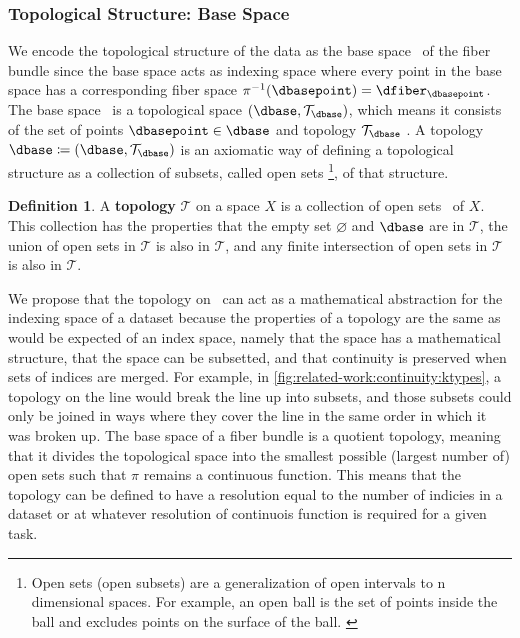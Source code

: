 \documentclass[10pt,journal,compsoc]{IEEEtran}
\theoremstyle{definition}
\newtheorem{definition}{Definition}[section]
\theoremstyle{remark}
\begin{document}
\subsubsection{Topological Structure: Base Space \dbase}
\label{sec:atct:fb:base}
We encode the topological structure of the data as the \textcolor{base}{base space} \dbase\ of the fiber bundle since the base space acts as indexing space where every point in the base space has a corresponding fiber space $\pi^{-1}(\dbasepoint) = \dfiber_{\dbasepoint}$. The \textcolor{base}{base space} \dbasec\ is a topological space $(\dbase,\mathcal{T}_{\dbase})$, which means it  consists of the set of points ${\dbasepoint \in \dbase}$ and topology $\mathcal{T}_{\dbase}$ \cite{munkresElementsAlgebraicTopology1984}. A topology $\dbase \coloneqq (\dbase,\mathcal{T}_{\dbase})$ is an axiomatic way of defining a topological structure\cite{bradleyTopologyCategoricalApproach2020}  as a collection of subsets, called open sets \footnote{Open sets (open subsets) are a generalization of open intervals to n dimensional spaces. For example, an open ball is the set of points inside the ball and excludes points on the surface of the ball. \cite{weissteinOpenSet,bradleyTopologyVsTopology}}, of that structure. 
\begin{definition}
A \textbf{topology} $\mathcal{T}$ on a space $X$ is a collection of open sets \openset\ of $X$. This collection has the properties that the empty set $\varnothing$ and $\dbase$ are in $\mathcal{T}$, the union of open sets in $\mathcal{T}$ is also in $\mathcal{T}$, and any finite intersection of open sets in $\mathcal{T}$ is also in $\mathscr{T}$. \cite{bradleyTopologyCategoricalApproach2020}
\end{definition}
We propose that the topology on \dbase\ can act as a mathematical abstraction for the \textcolor{base}{indexing space} of a dataset because the properties of a topology are the same as would be expected of an index space, namely that the space has a mathematical structure, that the space can be subsetted, and that continuity is preserved when sets of indices are merged. For example, in \autoref{fig:related-work:continuity:ktypes}, a topology on the line would break the line up into subsets, and those subsets could only be joined in ways where they cover the line in the same order in which it was broken up. The base space of a fiber bundle is a quotient topology\cite{QuotientSpaceTopology2020,munkresElementsAlgebraicTopology1984}, meaning that it divides the topological space into the smallest possible (largest number of) open sets such that $\pi$ remains a continuous function. This means that the topology can be defined to have a resolution equal to the number of indicies in a dataset or at whatever resolution of continuois function is required for a given task. 
\end{document}
